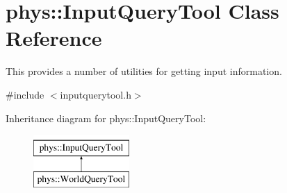 \hypertarget{classphys_1_1InputQueryTool}{
\section{phys::InputQueryTool Class Reference}
\label{da/d96/classphys_1_1InputQueryTool}
}


This provides a number of utilities for getting input information.  




{\ttfamily \#include $<$inputquerytool.h$>$}

Inheritance diagram for phys::InputQueryTool:\begin{figure}[H]
\begin{center}
\leavevmode
\includegraphics[height=2cm]{da/d96/classphys_1_1InputQueryTool}
\end{center}
\end{figure}
